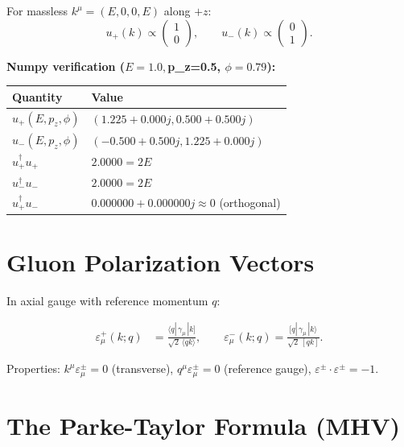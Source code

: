 \documentclass[12pt]{article}
\begin{document}
For massless $k^\mu=(E,0,0,E)$ along $+z$:
\begin{equation}
u_+(k)\propto\begin{pmatrix}1\\0\end{pmatrix},
\qquad
u_-(k)\propto\begin{pmatrix}0\\1\end{pmatrix} .
\end{equation}

\textbf{Numpy verification ($E=1.0, $p_z=0.5, $\phi=0.79$):}
\begin{center}
\begin{tabular}{|l|l|}
\hline
Quantity & Value \\
\hline
$u_+(E,p_z,\phi)$ & $(1.225+0.000j, 0.500+0.500j)$ \\
$u_-(E,p_z,\phi)$ & $(-0.500+0.500j, 1.225+0.000j)$ \\
$u_+^\dagger u_+$ & $2.0000 = 2E$ \\
$u_-^\dagger u_-$ & $2.0000 = 2E$ \\
$u_+^\dagger u_-$ & $0.000000+0.000000j \approx 0$ (orthogonal) \\
\hline
\end{tabular}
\end{center}

\section{Gluon Polarization Vectors}\label{sec:polarization}

In axial gauge with reference momentum $q$:

\begin{mdframed}
\begin{align}
\varepsilon^+_\mu(k;q)
&= \frac{\langle q|\,\gamma_\mu\,|k]}{\sqrt2\,\langle qk\rangle},
\qquad
\varepsilon^-_\mu(k;q)
= \frac{[q|\,\gamma_\mu\,|k\rangle}{\sqrt2\,[qk]} .
\tag{42.$\star$}
\end{align}
\end{mdframed}

Properties: $k^\mu\varepsilon_\mu^\pm=0$ (transverse),
$q^\mu\varepsilon_\mu^\pm=0$ (reference gauge),
$\varepsilon^\pm\cdot\varepsilon^\pm=-1$.

\section{The Parke-Taylor Formula (MHV)}\label{sec:mhv}
\end{document}
